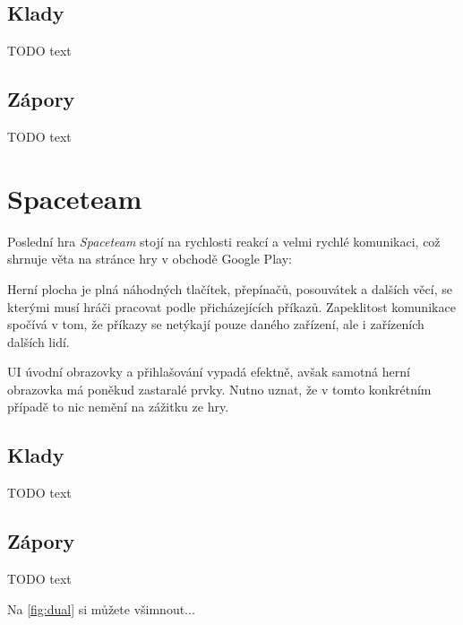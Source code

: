 
\subsection{Klady}

TODO text

\subsection{Zápory}

TODO text

\section{Spaceteam}

Poslední hra \emph{Spaceteam} stojí na rychlosti reakcí a velmi rychlé
komunikaci, což shrnuje věta na stránce hry \cite{henrysmithinc_spaceteam}
v obchodě Google Play: 

Herní plocha je plná náhodných tlačítek, přepínačů, posouvátek a dalších věcí,
se kterými musí hráči pracovat podle přicházejících
 příkazů.
Zapeklitost komunikace spočívá v tom, že příkazy se netýkají pouze daného
zařízení, ale i zařízeních dalších lidí.

UI úvodní obrazovky a přihlašování vypadá efektně, avšak samotná herní obrazovka
má poněkud zastaralé prvky.
Nutno uznat, že v tomto konkrétním případě to nic nemění na zážitku ze hry.


\subsection{Klady}

TODO text

\subsection{Zápory}

TODO text

Na \ref{fig:dual} si můžete všimnout...

